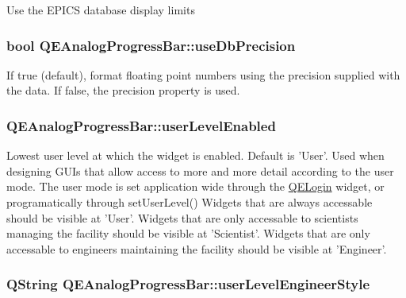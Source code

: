 \label{classQEAnalogProgressBar_a5ce12a78667eafebc8c9d7f9924acbf7}
Use the EPICS database display limits \hypertarget{classQEAnalogProgressBar_aaf63e282c7c2baf270bb6b096eac7bb5}{
\subsubsection[{useDbPrecision}]{\setlength{\rightskip}{0pt plus 5cm}bool QEAnalogProgressBar::useDbPrecision}}
\label{classQEAnalogProgressBar_aaf63e282c7c2baf270bb6b096eac7bb5}
If true (default), format floating point numbers using the precision supplied with the data. If false, the precision property is used. \hypertarget{classQEAnalogProgressBar_a7a7b55bb1e88670eeda1d8f759f18c0a}{
\subsubsection[{userLevelEnabled}]{ QEAnalogProgressBar::userLevelEnabled}}
\label{classQEAnalogProgressBar_a7a7b55bb1e88670eeda1d8f759f18c0a}
Lowest user level at which the widget is enabled. Default is 'User'. Used when designing GUIs that allow access to more and more detail according to the user mode. The user mode is set application wide through the \hyperlink{classQELogin}{QELogin} widget, or programatically through setUserLevel() Widgets that are always accessable should be visible at 'User'. Widgets that are only accessable to scientists managing the facility should be visible at 'Scientist'. Widgets that are only accessable to engineers maintaining the facility should be visible at 'Engineer'. \hypertarget{classQEAnalogProgressBar_a0f74beab0aaf83d08cef24458a80ef72}{
\subsubsection[{userLevelEngineerStyle}]{\setlength{\rightskip}{0pt plus 5cm}QString QEAnalogProgressBar::userLevelEngineerStyle}}
